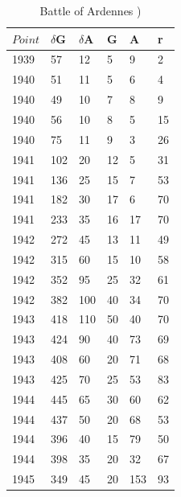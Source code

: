 \documentclass[]{article}
\begin{document}
\begin{table}
 

\tiny
\caption{Battle of Ardennes \cite{JohsonMackey:2011})\\}
\vspace{0.5cm}
\tiny

{\begin{tabular}{|p{.5cm}|p{.5cm}|p{.5cm}|p{.5cm}|p{.5cm}|p{.5cm}|} 
\hline
\centering

$Point$ & $\delta$G & $\delta$A	& G	& A & r \\
\hline  
1939&	57&	12&	5&	9&	2\\
1940&	51&	11&	5&	6&	4\\
1940&	49&	10&	7&	8&	9\\
1940&	56&	10&	8&	5&	15\\
1940&	75&	11&	9&	3&	26\\
1941&	102&	20&	12&	5&	31\\
1941&	136&	25&	15&	7&	53\\
1941&	182&	30&	17&	6&	70\\
1941&	233&	35&	16&	17&	70\\
1942&	272&	45&	13&	11&	49\\
1942&	315&	60&	15&	10&	58\\
1942&	352&	95&	25&	32&	61\\
1942&	382&	100&	40&	34&	70\\
1943&	418&	110&	50&	40&	70\\
1943&	424&	90&	40&	73&	69\\
1943&	408&	60&	20&	71&	68\\
1943&	425&	70&	25&	53&	83\\
1944&	445&	65&	30&	60&	62\\
1944&	437&	50&	20&	68&	53\\
1944&	396&	40&	15&	79&	50\\
1944&	398&	35&	20&	32&	67\\
1945&	349&	45&	20&	153&	93\\

\hline

\end{tabular}}%
\tiny
\end{table}
\end{document}
